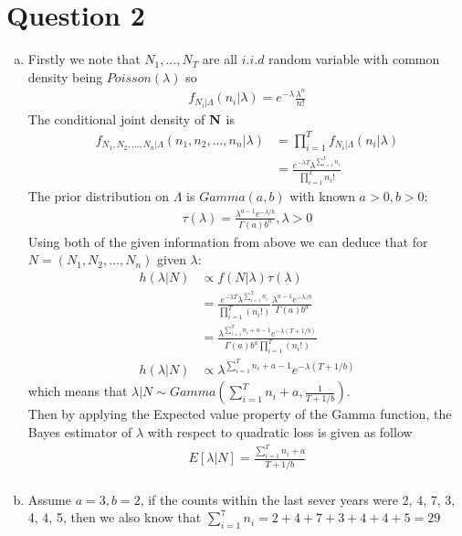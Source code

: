 \documentclass[a4paper,11pt]{article}
\begin{document}
\section*{Question 2}
	\begin{enumerate}[(a)]
	\item 
		Firstly we note that $N_1,...,N_T$ are all $i.i.d$ random variable with common density being $Poisson(\lambda)$ so
			\begin{align*}
				f_{N_i|\Lambda}(n_i|\lambda) = e^{-\lambda} \frac{\lambda^n}{n!} 
			\end{align*}
		The conditional joint density of ${\bold N}$ is
		 \begin{align*}
				f_{N_1,N_2,...,N_n|\Lambda}(n_1, n_2,...,n_n|\lambda) &= \prod^T_{i=1}f_{N_i|\Lambda}(n_i|\lambda) \\
				&=\frac{e^{-\lambda T}\lambda^{\sum^T_{i=1}n_i}}{\prod^T_{i=1}n_i!}
		\end{align*}
		The prior distribution on $\Lambda$ is $Gamma(a,b)$ with known $a>0, b>0$:
			\begin{align*}
				\tau(\lambda) = \frac{\lambda^{a-1}e^{-\lambda/b}}{\Gamma(a)b^a} , \lambda >0
			\end{align*}
		Using both of the given information from above we can deduce that for $N =(N_1,N_2,...,N_n)$ given $\lambda$:
			\begin{align*}
				h(\lambda|N) &\propto f(N|\lambda)\tau(\lambda)\\
				&= \frac{e^{-\lambda T}\lambda^{\sum^T_{i=1}n_i}}{\prod^T_{i=1}(n_i!)}\frac{\lambda^{a-1}e^{-\lambda/b}}{\Gamma(a)b^a} \\
				&= \frac{\lambda^{\sum^T_{i=1}n_i+a-1}e^{-\lambda(T+1/b)}}{\Gamma(a)b^a\prod^T_{i=1}(n_i!)}\\
				h(\lambda|N) &\propto  \lambda^{\sum^T_{i=1}n_i+a-1}e^{-\lambda(T+1/b)} 
			\end{align*}
		which means that $\lambda|N \sim Gamma (\sum^T_{i=1}n_i+a, \frac{1}{T+1/b})$.\\
		Then by applying the Expected value property of the Gamma function, the Bayes estimator of $\lambda$ with respect to quadratic loss is given as follow
			\begin{align*}
			E[\lambda|N] = \frac{\sum^T_{i=1}n_i+a}{T+1/b}\\
			\end{align*}
		\item
			Assume $a=3, b=2$, if the counts within the last sever years were 2, 4, 7,  3, 4, 4, 5, then we also know that $\sum^7_{i=1}n_i =2+4+7+3+4+4+5= 29$\\

\end{enumerate}
\end{document}
